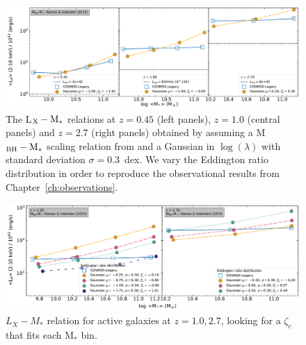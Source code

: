 \begin{figure}
\begin{center}
  \includegraphics[width=\textwidth]{Figs/Chapter3/fig3_active.pdf}
  \caption{The L$_{\rm X}-{\rm M}_*$ relations at $z=0.45$ (left panels), $z=1.0$ (central panels) and $z=2.7$ (right panels) obtained by assuming a M$_{\rm BH}-{\rm M}_*$ scaling relation from \citet{2015ApJ...813...82R} and a Gaussian in $\log (\lambda)$ with standard deviation $\sigma=0.3$~dex. We vary the Eddington ratio distribution in order to reproduce the observational results from Chapter~\ref{ch:observations}. }

    \label{fig:LX_M_redshift}
\end{center}
\end{figure}

\begin{figure}
	\includegraphics[width=\textwidth]{Figs/Chapter3/Best_Edd_for_mass_active_z2.7.pdf}
	\caption{$L_X-M_*$ relation for active galaxies at $z=1.0,2.7$, looking for a $\zeta_c$ that fits each M$_*$ bin.}
	\label{fig:LX_foreach_M}
\end{figure}

